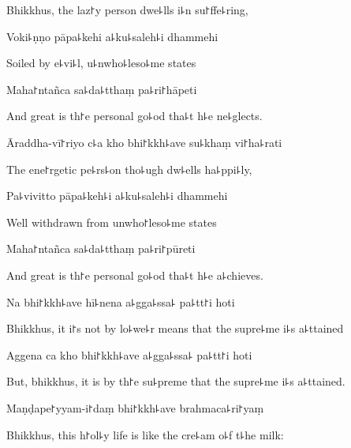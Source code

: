 \begin{english}
  Bhikkhus, the laz꜓y person dwe꜕lls i꜕n su꜓ffe꜕ring,
\end{english}

Voki꜕ṇṇo pāpa꜕kehi a꜕ku꜕saleh꜕i dhammehi

\begin{english}
  Soiled by e꜕vi꜕l, u꜕nwho꜕leso꜕me states
\end{english}

Maha꜓ntañca sa꜕da꜕tthaṃ pa꜕ri꜓hāpeti

\begin{english}
  And great is th꜓e personal go꜕od tha꜕t h꜕e ne꜕glects.
\end{english}

\ifaivedition
\clearpage
\fi

Āraddha-vī꜓riyo c꜕a kho bhi꜓kkh꜕ave su꜕khaṃ vi꜓ha꜕rati

\begin{english}
  The ene꜓rgetic pe꜕rs꜕on tho꜕ugh dw꜕ells ha꜕ppi꜕ly,
\end{english}

Pa꜕vivitto pāpa꜕keh꜕i a꜕ku꜕saleh꜕i dhammehi

\begin{english}
  Well withdrawn from unwho꜓leso꜕me states
\end{english}

Maha꜓ntañca sa꜕da꜕tthaṃ pa꜕ri꜓pūreti

\begin{english}
  And great is th꜓e personal go꜕od tha꜕t h꜕e a꜕chieves.
\end{english}

Na bhi꜓kkh꜕ave hī꜕nena a꜕gga꜕ssa꜕ pa꜕tt꜓i hoti

\begin{english}
  Bhikkhus, it i꜓s not by lo꜕we꜕r means that the supre꜕me i꜕s a꜕ttained
\end{english}

Aggena ca kho bhi꜓kkh꜕ave a꜕gga꜕ssa꜕ pa꜕tt꜓i hoti

\begin{english}
  But, bhikkhus, it is by th꜓e su꜕preme that the supre꜕me i꜕s a꜕ttained.
\end{english}

Maṇḍape꜓yyam-i꜓daṃ bhi꜓kkh꜕ave brahmaca꜕ri꜓yaṃ

\begin{english}
  Bhikkhus, this h꜓ol꜕y life is like the cre꜕am o꜕f t꜕he milk:
\end{english}

